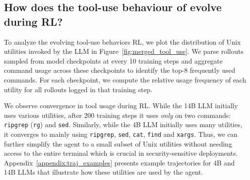 \subsection{How does the tool-use behaviour of \methodname evolve during RL?}\label{sec:tool_use_behaviour}
To analyze the evolving tool-use behaviors RL, we plot the distribution of Unix utilities invoked by the LLM in Figure~\ref{fig:merged_tool_use}. We parse rollouts sampled from model checkpoints at every 10 training steps and aggregate command usage across these checkpoints to identify the top-8 frequently used commands. For each checkpoint, we compute the relative usage frequency of each utility for all rollouts logged in that training step.

We observe convergence in tool usage during RL. While the 14B LLM initially uses various utilities, after 200 training steps it uses \emph{only} on two commands: \texttt{ripgrep} (\texttt{rg}) and \texttt{sed}. Similarly, while the 4B LLM initially uses many utilities, it converges to mainly using \texttt{ripgrep}, \texttt{sed}, \texttt{cat}, \texttt{find} and \texttt{xargs}. Thus, we can further simplify the agent to a small subset of Unix utilities without needing access to the entire terminal which is crucial in security-sensitive deployments. Appendix~\ref{appendix:traj_examples} presents example trajectories for 4B and 14B LLMs that illustrate how these utilities are used by the agent.

